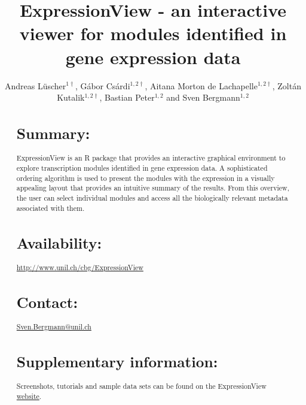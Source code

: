 \documentclass[round]{bioinfo}
\begin{document}
\application{}
\title[ExpressionView]{ExpressionView - an interactive viewer for
  modules identified in gene expression data} 
\author[Andreas L\"uscher, G\'abor Cs\'ardi, Aitana Morton de
Lachapelle, Zolt\'an Kutalik, and Sven Bergmann]{Andreas
  L\"uscher$^{1\dagger}$, G\'abor Cs\'ardi$^{1,2\dagger}$, Aitana Morton de
  Lachapelle$^{1,2\dagger}$, Zolt\'an Kutalik$^{1,2\dagger}$, 
  Bastian Peter$^{1,2}$
  and Sven Bergmann$^{1,2}$}
\address{
  $^{1}$Swiss Institute of Bioinformatics, Lausanne, Switzerland\\
  $^{2}$Department of Medical Genetics, University of Lausanne,
  Lausanne, Switzerland\\
  +: equal contribution
}



\maketitle

\begin{abstract}
\section{Summary:}
ExpressionView is an R package that provides an interactive graphical
environment to explore transcription modules identified in gene expression
data. A sophisticated ordering algorithm is used to present the
modules with the expression in a visually appealing layout that provides an intuitive
summary of the results. From this overview, the user can select
individual modules and access all the biologically relevant metadata
associated with them.

\section{Availability:} 
\url{http://www.unil.ch/cbg/ExpressionView}

\section{Contact:} \href{Sven.Bergmann@unil.ch}{Sven.Bergmann@unil.ch}

\section{Supplementary information:}
Screenshots, tutorials and sample data sets can be found on the
ExpressionView \href{http://www.unil.ch/cbg/ExpressionView}{website}. 
\end{abstract}
\end{document}
